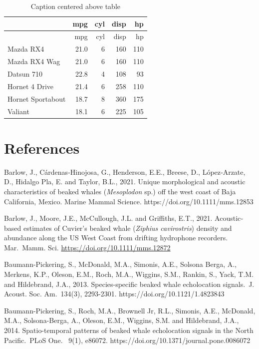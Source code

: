\documentclass[
  authoryear,
  preprint,
  3p]{elsarticle}
\begin{document}
\hypertarget{tbl-simple}{}
\begin{longtable}[]{@{}lrrrr@{}}
\caption{\label{tbl-simple}Caption centered above table}\tabularnewline
\toprule()
& mpg & cyl & disp & hp \\
\midrule()
\endfirsthead
\toprule()
& mpg & cyl & disp & hp \\
\midrule()
\endhead
Mazda RX4 & 21.0 & 6 & 160 & 110 \\
Mazda RX4 Wag & 21.0 & 6 & 160 & 110 \\
Datsun 710 & 22.8 & 4 & 108 & 93 \\
Hornet 4 Drive & 21.4 & 6 & 258 & 110 \\
Hornet Sportabout & 18.7 & 8 & 360 & 175 \\
Valiant & 18.1 & 6 & 225 & 105 \\
\bottomrule()
\end{longtable}

\hypertarget{references}{%
\section*{References}\label{references}}

Barlow, J., Cárdenas‐Hinojosa, G., Henderson, E.E., Breese, D.,
López‐Arzate, D., Hidalgo Pla, E. and Taylor, B.L., 2021. Unique
morphological and acoustic characteristics of beaked whales
(\emph{Mesoplodon} sp.) off the west coast of Baja California, Mexico.
Marine Mammal Science. https://doi.org/10.1111/mms.12853

Barlow, J., Moore, J.E., McCullough, J.L. and Griffiths, E.T., 2021.
Acoustic‐based estimates of Cuvier's beaked whale (\emph{Ziphius
cavirostris}) density and abundance along the US West Coast from
drifting hydrophone recorders. Mar.~Mamm. Sci.
\url{https://doi.org/10.1111/mms.12872}

Baumann-Pickering, S., McDonald, M.A., Simonis, A.E., Solsona Berga, A.,
Merkens, K.P., Oleson, E.M., Roch, M.A., Wiggins, S.M., Rankin, S.,
Yack, T.M. and Hildebrand, J.A., 2013. Species-specific beaked whale
echolocation signals.~J. Acoust. Soc. Am.~134(3), 2293-2301.
https://doi.org/10.1121/1.4823843

Baumann-Pickering, S., Roch, M.A., Brownell Jr, R.L., Simonis, A.E.,
McDonald, M.A., Solsona-Berga, A., Oleson, E.M., Wiggins, S.M. and
Hildebrand, J.A., 2014. Spatio-temporal patterns of beaked whale
echolocation signals in the North Pacific.~PLoS One. ~9(1), e86072.
https://doi.org/10.1371/journal.pone.0086072
\end{document}
